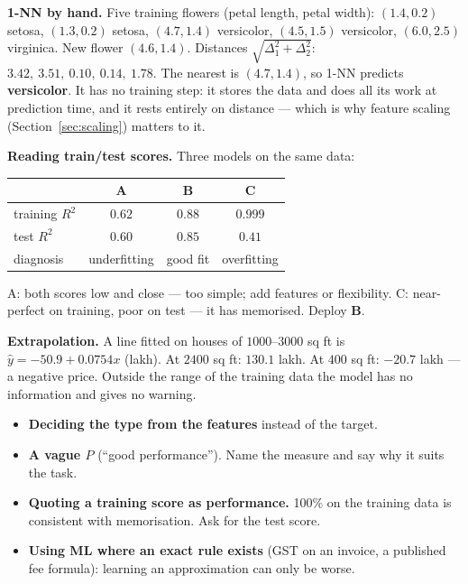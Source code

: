 \documentclass[11pt]{article}
\begin{document}
\begin{worked}
\textbf{1-NN by hand.} Five training flowers (petal length, petal width):
$(1.4, 0.2)$ setosa, $(1.3, 0.2)$ setosa, $(4.7, 1.4)$ versicolor,
$(4.5, 1.5)$ versicolor, $(6.0, 2.5)$ virginica. New flower $(4.6, 1.4)$.
Distances $\sqrt{\Delta_1^2 + \Delta_2^2}$: $3.42,\ 3.51,\ \mathbf{0.10},\
0.14,\ 1.78$. The nearest is $(4.7, 1.4)$, so 1-NN predicts
\textbf{versicolor}. It has no training step: it stores the data and does all
its work at prediction time, and it rests entirely on distance --- which is
why feature scaling (Section~\ref{sec:scaling}) matters to it.

\textbf{Reading train/test scores.} Three models on the same data:
\begin{center}
\small
\begin{tabular}{@{}lccc@{}}
\toprule
 & A & B & C\\ \midrule
training $R^2$ & $0.62$ & $0.88$ & $0.999$\\
test $R^2$ & $0.60$ & $0.85$ & $0.41$\\ \midrule
diagnosis & underfitting & good fit & overfitting\\
\bottomrule
\end{tabular}
\end{center}
A: both scores low and close --- too simple; add features or flexibility.
C: near-perfect on training, poor on test --- it has memorised. Deploy
\textbf{B}.

\textbf{Extrapolation.} A line fitted on houses of $1000$--$3000$ sq ft is
$\hat y = -50.9 + 0.0754x$ (lakh). At $2400$ sq ft: $130.1$ lakh. At $400$
sq ft: $-20.7$ lakh --- a negative price. Outside the range of the training
data the model has no information and gives no warning.
\end{worked}

\begin{caution}
\begin{itemize}
  \item \textbf{Deciding the type from the features} instead of the target.
  \item \textbf{A vague $P$} (``good performance''). Name the measure and say
    why it suits the task.
  \item \textbf{Quoting a training score as performance.} 100\% on the
    training data is consistent with memorisation. Ask for the test score.
  \item \textbf{Using ML where an exact rule exists} (GST on an invoice, a
    published fee formula): learning an approximation can only be worse.
\end{itemize}
\end{caution}
\end{document}
